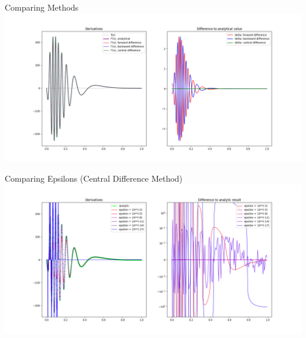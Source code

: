\begin{frame}{Comparing Methods}
%
\includegraphics[width=\linewidth]{./gfx/06-derivative-methods}
%
\end{frame}


\begin{frame}{Comparing Epsilons (Central Difference Method)}
%
\includegraphics[width=\linewidth]{./gfx/06-derivative-epsilons}
%
\end{frame}


